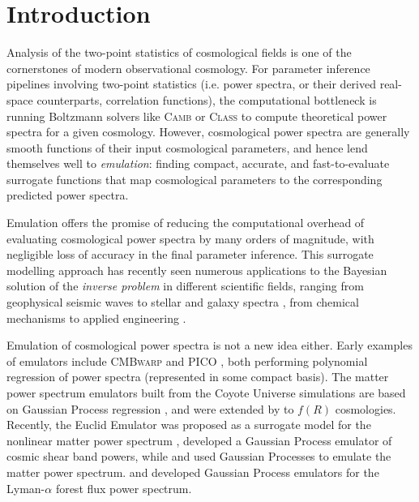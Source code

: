 \documentclass[fleqn,usenatbib]{mnras}
\begin{document}


\section{Introduction}\label{sec:introduction}
Analysis of the two-point statistics of cosmological fields is one of the cornerstones of modern observational cosmology. For parameter inference pipelines involving two-point statistics (i.e. power spectra, or their derived real-space counterparts, correlation functions), the computational bottleneck is running Boltzmann solvers like \textsc{Camb} \citep{Lewis99} or \textsc{Class} \citep{Lesgourgues11, Blas11} to compute theoretical power spectra for a given cosmology. However, cosmological power spectra are generally smooth functions of their input cosmological parameters, and hence lend themselves well to \emph{emulation}: finding compact, accurate, and fast-to-evaluate surrogate functions that map cosmological parameters to the corresponding predicted power spectra. 

Emulation offers the promise of reducing the computational overhead of evaluating cosmological power spectra by many orders of magnitude, with negligible loss of accuracy in the final parameter inference. This surrogate modelling approach has recently seen numerous applications to the Bayesian solution of the \textit{inverse problem} in different scientific fields, ranging from geophysical seismic waves \citep{Das18, SpurioMancini20, Piras21} to stellar and galaxy spectra \citep{Czekala15, Alsing20}, from chemical mechanisms \citep{deMijolla19, Kasim20} to applied engineering \citep{Thiagarajan20, Buffington20}.

Emulation of cosmological power spectra is not a new idea either. Early examples of emulators include \textsc{CMBwarp} \citep{Jimenez04} and \textsc{PICO} \citep{Fendt07}, both performing polynomial regression of power spectra (represented in some compact basis). The matter power spectrum emulators built from the Coyote Universe simulations \citep{Heitmann09, Heitmann10, Heitmann13, Lawrence10b, Lawrence17} are based on Gaussian Process regression \citep{Rasmussen05}, and were extended by \citet{Ramachandra20} to $f(R)$ cosmologies. Recently, the Euclid Emulator was proposed as a surrogate model for the nonlinear matter power spectrum \citep{Knabenhans19, euclidcollaboration20}, \citet{Mootoovaloo20} developed a Gaussian Process emulator of cosmic shear band powers, while \citet{Mootoovaloo21} and \citet{Ho21} used Gaussian Processes to emulate the matter power spectrum. \citet{Bird19} and \citet{Rogers19} developed Gaussian Process emulators for the Lyman-$\alpha$ forest flux power spectrum.
\end{document}
